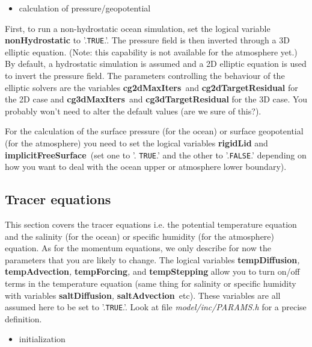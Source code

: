 \begin{itemize} 
\item calculation of pressure/geopotential
\end{itemize} 

First, to run a non-hydrostatic ocean simulation, set the logical variable 
\textbf{nonHydrostatic} to '.\texttt{TRUE}.'. The pressure field is then
inverted through a 3D elliptic equation. (Note: this capability is not
available for the atmosphere yet.) By default, a hydrostatic simulation is
assumed and a 2D elliptic equation is used to invert the pressure field. The
parameters controlling the behaviour of the elliptic solvers are the
variables \textbf{cg2dMaxIters}\textit{\ }and \textbf{cg2dTargetResidual }%
for the 2D case and \textbf{cg3dMaxIters}\textit{\ }and \textbf{%
cg3dTargetResidual }for the 3D case. You probably won't need to alter the
default values (are we sure of this?).

For the calculation of the surface pressure (for the ocean) or surface
geopotential (for the atmosphere) you need to set the logical variables 
\textbf{rigidLid} and \textbf{implicitFreeSurface}\textit{\ }(set one to '.%
\texttt{TRUE}.' and the other to '.\texttt{FALSE}.' depending on how you
want to deal with the ocean upper or atmosphere lower boundary).

\subsection{Tracer equations}

This section covers the tracer equations i.e. the potential temperature
equation and the salinity (for the ocean) or specific humidity (for the
atmosphere) equation. As for the momentum equations, we only describe for
now the parameters that you are likely to change. The logical variables 
\textbf{tempDiffusion}\textit{, }\textbf{tempAdvection}\textit{, }\textbf{%
tempForcing}\textit{,} and \textbf{tempStepping} allow you to turn on/off
terms in the temperature equation (same thing for salinity or specific
humidity with variables \textbf{saltDiffusion}\textit{, }\textbf{%
saltAdvection}\textit{\ }etc). These variables are all assumed here to be
set to '.\texttt{TRUE}.'. Look at file \textit{model/inc/PARAMS.h }for a
precise definition.

\begin{itemize}
\item initialization
\end{itemize}

